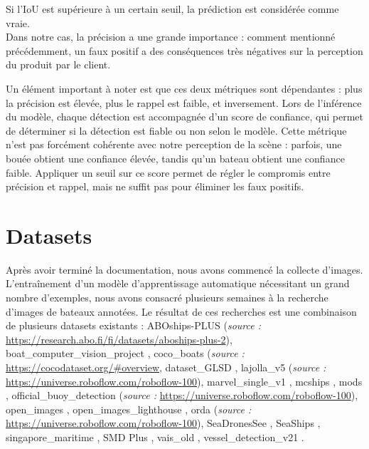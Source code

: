 Si l'IoU est supérieure à un certain seuil, la prédiction est considérée comme vraie.\\

Dans notre cas, la précision a une grande importance : comment mentionné précédemment,
un faux positif a des conséquences très négatives sur la perception du produit par le client.

Un élément important à noter est que ces deux métriques sont dépendantes : plus la précision est élevée,
plus le rappel est faible, et inversement. Lors de l'inférence du modèle, chaque détection est accompagnée
d'un score de confiance, qui permet de déterminer si la détection est fiable ou non
selon le modèle. Cette métrique n'est pas forcément cohérente avec notre perception 
de la scène : parfois, une bouée obtient une confiance élevée, tandis qu'un bateau
obtient une confiance faible. Appliquer un seuil
sur ce score permet de régler le compromis entre précision et rappel, 
mais ne suffit pas pour éliminer les faux positifs.\\

\section{Datasets}

Après avoir terminé la documentation, nous avons commencé la collecte d'images.
L'entraînement d'un modèle d'apprentissage automatique nécessitant un grand nombre d'exemples,
nous avons consacré plusieurs semaines à la recherche d'images de bateaux annotées.
Le résultat de ces recherches est une combinaison de plusieurs datasets existants :
ABOships-PLUS (\textit{source : }\url{https://research.abo.fi/fi/datasets/aboships-plus-2}), 
boat\_computer\_vision\_project \cite{boat-detection-4tmst_dataset}, 
coco\_boats (\textit{source : }\url{https://cocodataset.org/#overview}, 
dataset\_GLSD \cite{Shao_Wang_Deng_Huang_Lu_Luo_Zhang_Lv_Dang_Ding_etal_2021}, 
lajolla\_v5 (\textit{source : }\url{https://universe.roboflow.com/roboflow-100}),
marvel\_single\_v1 \cite{MARVEL},
mcships \cite{Mcships2020},
mods \cite{Bovcon_Muhovic_Vranac_Mozetic_Pers_Kristan_2021},
official\_buoy\_detection (\textit{source : }\url{https://universe.roboflow.com/roboflow-100}),
open\_images \cite{OpenImages2}, 
open\_images\_lighthouse \cite{OpenImages2},
orda (\textit{source : }\url{https://universe.roboflow.com/roboflow-100}), 
SeaDronesSee \cite{varga2022seadronessee}, 
SeaShips \cite{shao2018seaships},
singapore\_maritime \cite{Prasad_Rajan_Rachmawati_Rajabaly_Quek_2016}, 
SMD Plus \cite{smd_plus}, 
vais\_old \cite{vais_old}, 
vessel\_detection\_v21 \cite{Matasci_Plante_Kasa_Mousavi_Stewart_Macdonald_Webster_Busler_2021}.


